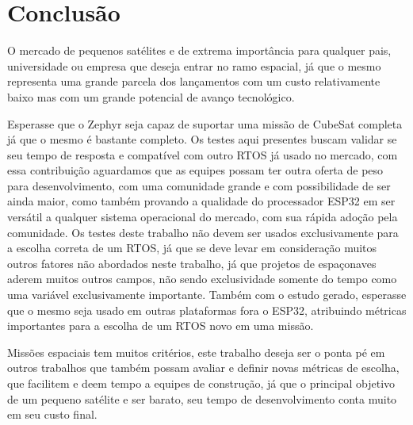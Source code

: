 
\chapter{Conclusão}\label{cap:conclusao}


O mercado de pequenos satélites e de extrema importância para qualquer pais, 
universidade ou empresa que deseja entrar no ramo espacial, já que o mesmo 
representa uma grande parcela dos lançamentos com um custo relativamente baixo 
mas com um grande potencial de avanço tecnológico.

Esperasse que o Zephyr seja capaz de suportar uma missão de CubeSat completa 
já que o mesmo é bastante completo. Os testes aqui presentes buscam validar se seu 
tempo de resposta e compatível com outro RTOS já usado no mercado, com essa 
contribuição aguardamos que as equipes possam ter outra oferta de peso para 
desenvolvimento, com uma comunidade grande e com possibilidade de ser ainda 
maior, como também provando a qualidade do processador ESP32 em ser versátil 
a qualquer sistema operacional do mercado, com sua rápida adoção pela comunidade. 
Os testes deste trabalho não devem ser usados exclusivamente para 
a escolha correta de um RTOS, já que se deve levar em consideração muitos 
outros fatores não abordados neste trabalho, já que projetos de espaçonaves 
aderem muitos outros campos, não sendo exclusividade somente do tempo como 
uma variável exclusivamente importante. 
Também com o estudo gerado, esperasse que o mesmo seja usado em outras 
plataformas fora o ESP32, atribuindo métricas importantes para a escolha de um 
RTOS novo em uma missão. 

Missões espaciais tem muitos critérios, este trabalho deseja ser o ponta pé em 
outros trabalhos que também possam avaliar e definir novas métricas de escolha, 
que facilitem e deem tempo a equipes de construção, já que o principal objetivo 
de um pequeno satélite e ser barato, seu tempo de desenvolvimento conta muito em 
seu custo final.


